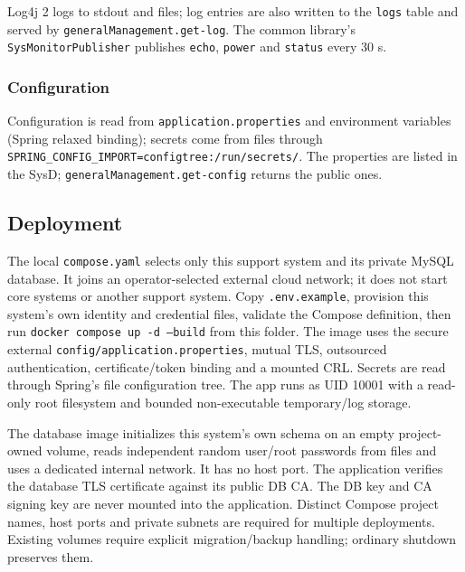 \documentclass[a4paper]{arrowhead}
\begin{document}
Log4j 2 logs to stdout and files; log entries are also written to the \texttt{logs} table and served by \texttt{general\allowbreak{}Management.\allowbreak{}get-\allowbreak{}log}. The common library's \texttt{Sys\allowbreak{}Monitor\allowbreak{}Publisher} publishes \texttt{echo}, \texttt{power} and \texttt{status} every 30 s.

\subsubsection{Configuration}

Configuration is read from \texttt{application.\allowbreak{}properties} and environment variables (Spring relaxed binding); secrets come from files through \texttt{SPRING\_\allowbreak{}CONFIG\_\allowbreak{}IMPORT=\allowbreak{}configtree:\allowbreak{}/\allowbreak{}run/\allowbreak{}secrets/\allowbreak{}}. The properties are listed in the SysD; \texttt{general\allowbreak{}Management.\allowbreak{}get-\allowbreak{}config} returns the public ones.

\subsection{Deployment}

The local \texttt{compose.yaml} selects only this support system and its private MySQL database. It joins an operator-selected external cloud network; it does not start core systems or another support system. Copy \texttt{.env.example}, provision this system's own identity and credential files, validate the Compose definition, then run \texttt{docker compose up -d --build} from this folder. The image uses the secure external \texttt{config/application.properties}, mutual TLS, outsourced authentication, certificate/token binding and a mounted CRL. Secrets are read through Spring's file configuration tree. The app runs as UID 10001 with a read-only root filesystem and bounded non-executable temporary/log storage.

The database image initializes this system's own schema on an empty project-owned volume, reads independent random user/root passwords from files and uses a dedicated internal network. It has no host port. The application verifies the database TLS certificate against its public DB CA. The DB key and CA signing key are never mounted into the application. Distinct Compose project names, host ports and private subnets are required for multiple deployments. Existing volumes require explicit migration/backup handling; ordinary shutdown preserves them.
\end{document}
